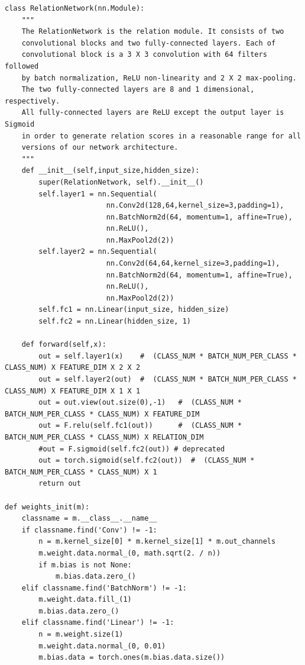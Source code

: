 \documentclass[12pt,a4paper,titlepage]{article}
\begin{document}
\begin{lstlisting}[language=iPython,firstnumber=1, caption=relation\_network.py, label=relation network,captionpos=b]
class RelationNetwork(nn.Module):
    """
    The RelationNetwork is the relation module. It consists of two 
    convolutional blocks and two fully-connected layers. Each of 
    convolutional block is a 3 X 3 convolution with 64 filters followed 
    by batch normalization, ReLU non-linearity and 2 X 2 max-pooling.
    The two fully-connected layers are 8 and 1 dimensional, respectively. 
    All fully-connected layers are ReLU except the output layer is Sigmoid 
    in order to generate relation scores in a reasonable range for all 
    versions of our network architecture.
    """
    def __init__(self,input_size,hidden_size):
        super(RelationNetwork, self).__init__()
        self.layer1 = nn.Sequential(
                        nn.Conv2d(128,64,kernel_size=3,padding=1),
                        nn.BatchNorm2d(64, momentum=1, affine=True),
                        nn.ReLU(),
                        nn.MaxPool2d(2))
        self.layer2 = nn.Sequential(
                        nn.Conv2d(64,64,kernel_size=3,padding=1),
                        nn.BatchNorm2d(64, momentum=1, affine=True),
                        nn.ReLU(),
                        nn.MaxPool2d(2))
        self.fc1 = nn.Linear(input_size, hidden_size)
        self.fc2 = nn.Linear(hidden_size, 1)

    def forward(self,x):
        out = self.layer1(x)    #  (CLASS_NUM * BATCH_NUM_PER_CLASS * CLASS_NUM) X FEATURE_DIM X 2 X 2
        out = self.layer2(out)  #  (CLASS_NUM * BATCH_NUM_PER_CLASS * CLASS_NUM) X FEATURE_DIM X 1 X 1
        out = out.view(out.size(0),-1)   #  (CLASS_NUM * BATCH_NUM_PER_CLASS * CLASS_NUM) X FEATURE_DIM
        out = F.relu(self.fc1(out))      #  (CLASS_NUM * BATCH_NUM_PER_CLASS * CLASS_NUM) X RELATION_DIM
        #out = F.sigmoid(self.fc2(out)) # deprecated
        out = torch.sigmoid(self.fc2(out))  #  (CLASS_NUM * BATCH_NUM_PER_CLASS * CLASS_NUM) X 1
        return out

def weights_init(m):
    classname = m.__class__.__name__
    if classname.find('Conv') != -1:
        n = m.kernel_size[0] * m.kernel_size[1] * m.out_channels
        m.weight.data.normal_(0, math.sqrt(2. / n))
        if m.bias is not None:
            m.bias.data.zero_()
    elif classname.find('BatchNorm') != -1:
        m.weight.data.fill_(1)
        m.bias.data.zero_()
    elif classname.find('Linear') != -1:
        n = m.weight.size(1)
        m.weight.data.normal_(0, 0.01)
        m.bias.data = torch.ones(m.bias.data.size())
\end{lstlisting}
\end{document}
